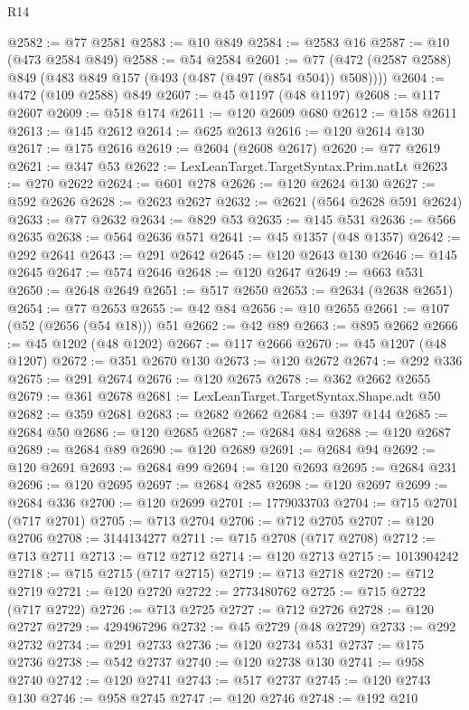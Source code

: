 \begin{lexlean}{R14}
\begin{coremodule}
@2582 := @77 @2581
@2583 := @10 @849
@2584 := @2583 @16
@2587 := @10 (@473 @2584 @849)
@2588 := @54 @2584
@2601 := @77 (@472 (@2587 @2588) @849 (@483 @849 @157 (@493 (@487 (@497 (@854 @504)) @508))))
@2604 := @472 (@109 @2588) @849
@2607 := @45 @1197 (@48 @1197)
@2608 := @117 @2607
@2609 := @518 @174
@2611 := @120 @2609 @680
@2612 := @158 @2611
@2613 := @145 @2612
@2614 := @625 @2613
@2616 := @120 @2614 @130
@2617 := @175 @2616
@2619 := @2604 (@2608 @2617)
@2620 := @77 @2619
@2621 := @347 @53
@2622 := LexLeanTarget.TargetSyntax.Prim.natLt
@2623 := @270 @2622
@2624 := @601 @278
@2626 := @120 @2624 @130
@2627 := @592 @2626
@2628 := @2623 @2627
@2632 := @2621 (@564 @2628 @591 @2624)
@2633 := @77 @2632
@2634 := @829 @53
@2635 := @145 @531
@2636 := @566 @2635
@2638 := @564 @2636 @571
@2641 := @45 @1357 (@48 @1357)
@2642 := @292 @2641
@2643 := @291 @2642
@2645 := @120 @2643 @130
@2646 := @145 @2645
@2647 := @574 @2646
@2648 := @120 @2647
@2649 := @663 @531
@2650 := @2648 @2649
@2651 := @517 @2650
@2653 := @2634 (@2638 @2651)
@2654 := @77 @2653
@2655 := @42 @84
@2656 := @10 @2655
@2661 := @107 (@52 (@2656 (@54 @18))) @51
@2662 := @42 @89
@2663 := @895 @2662
@2666 := @45 @1202 (@48 @1202)
@2667 := @117 @2666
@2670 := @45 @1207 (@48 @1207)
@2672 := @351 @2670 @130
@2673 := @120 @2672
@2674 := @292 @336
@2675 := @291 @2674
@2676 := @120 @2675
@2678 := @362 @2662 @2655
@2679 := @361 @2678
@2681 := LexLeanTarget.TargetSyntax.Shape.adt @50
@2682 := @359 @2681
@2683 := @2682 @2662
@2684 := @397 @144
@2685 := @2684 @50
@2686 := @120 @2685
@2687 := @2684 @84
@2688 := @120 @2687
@2689 := @2684 @89
@2690 := @120 @2689
@2691 := @2684 @94
@2692 := @120 @2691
@2693 := @2684 @99
@2694 := @120 @2693
@2695 := @2684 @231
@2696 := @120 @2695
@2697 := @2684 @285
@2698 := @120 @2697
@2699 := @2684 @336
@2700 := @120 @2699
@2701 := 1779033703
@2704 := @715 @2701 (@717 @2701)
@2705 := @713 @2704
@2706 := @712 @2705
@2707 := @120 @2706
@2708 := 3144134277
@2711 := @715 @2708 (@717 @2708)
@2712 := @713 @2711
@2713 := @712 @2712
@2714 := @120 @2713
@2715 := 1013904242
@2718 := @715 @2715 (@717 @2715)
@2719 := @713 @2718
@2720 := @712 @2719
@2721 := @120 @2720
@2722 := 2773480762
@2725 := @715 @2722 (@717 @2722)
@2726 := @713 @2725
@2727 := @712 @2726
@2728 := @120 @2727
@2729 := 4294967296
@2732 := @45 @2729 (@48 @2729)
@2733 := @292 @2732
@2734 := @291 @2733
@2736 := @120 @2734 @531
@2737 := @175 @2736
@2738 := @542 @2737
@2740 := @120 @2738 @130
@2741 := @958 @2740
@2742 := @120 @2741
@2743 := @517 @2737
@2745 := @120 @2743 @130
@2746 := @958 @2745
@2747 := @120 @2746
@2748 := @192 @210

\end{coremodule}
\end{lexlean}
